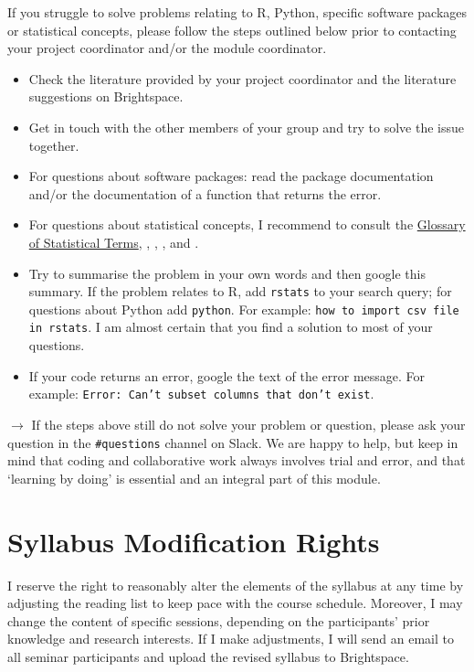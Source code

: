\documentclass[abstract=on,parskip=full,headings=standardclasses,fontsize=11pt,paper=a4]{scrartcl}
\begin{document}
If you struggle to solve problems relating to \textsf{R}, Python, specific software packages or statistical concepts, please follow the steps outlined below prior to contacting your project coordinator and/or the module coordinator. %
\begin{itemize}
\item Check the literature provided by your project coordinator and the literature suggestions on Brightspace.
\item Get in touch with the other members of your group and try to solve the issue together.
\item For questions about software packages: read the package documentation and/or the documentation of a  function that returns the error.
\item For questions about statistical concepts, I recommend to consult the \href{https://hbiostat.org/doc/glossary.pdf}{Glossary of Statistical Terms}, \textcite{vanatteveldt21}, \textcite{ismay20}, \textcite{wickham17}, and \textcite{healy19}.
\item Try to summarise the problem in your own words and then google this summary. If the problem relates to \textsf{R}, add \texttt{rstats} to your search query; for questions about Python add \texttt{python}. For example: \texttt{how to import csv file in rstats}. I am almost certain that you find a solution to most of your questions. 
\item If your code returns an error, google the text of the error message.  For example: \texttt{Error: Can't subset columns that don't exist}.
\end{itemize}

$\longrightarrow$ If the steps above still do not solve your problem or question, please ask your question in the \texttt{\#questions}  channel on Slack. We are happy to help, but keep in mind that coding and collaborative work always involves trial and error, and that `learning by doing' is essential and an integral part of this module.

\section*{Syllabus Modification Rights}

I reserve the right to reasonably alter the elements of the syllabus at any time by adjusting the reading list to keep pace with the course schedule. Moreover, I may change the content of specific sessions, depending on the participants' prior knowledge and research interests. If I make adjustments, I will send an email to all seminar participants and upload the revised syllabus to Brightspace.
\end{document}
